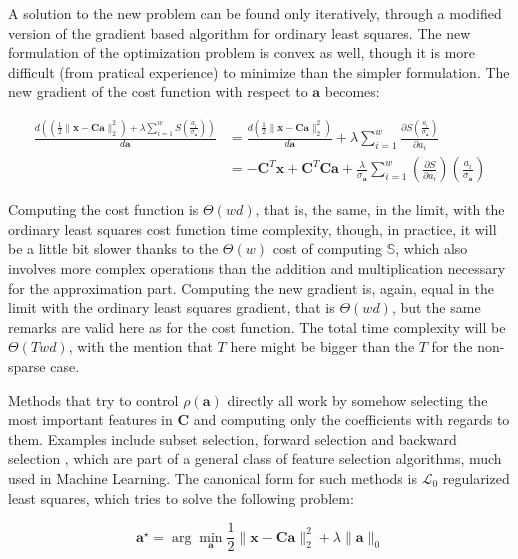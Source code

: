 \documentclass[12pt,a4paper,oneside,english]{UPBThesis}
\begin{document}
A solution to the new problem can be found only iteratively, through a modified version of the gradient based algorithm for ordinary least squares. The new formulation of the optimization problem is convex as well, though it is more difficult (from pratical experience) to minimize than the simpler formulation. The new gradient of the cost function with respect to $\textbf{a}$ becomes:

\begin{align*}
\frac{d \left( \left( \frac{1}{2}\|\textbf{x} - \textbf{C}\textbf{a}\|_2^2 \right) + \lambda\sum_{i=1}^{w}{S(\frac{a_i}{\sigma_{\textbf{a}}})} \right)}{d\textbf{a}} & = \frac{d \left( \frac{1}{2}\|\textbf{x} - \textbf{C}\textbf{a}\|_2^2 \right)}{d\textbf{a}} + \lambda\sum_{i=1}^{w}\frac{\partial S(\frac{a_i}{\sigma_{\textbf{a}}})}{\partial a_i} \\
& = -\textbf{C}^T\textbf{x} + \textbf{C}^T\textbf{C}\textbf{a} + \frac{\lambda}{\sigma_{\textbf{a}}} \sum_{i=1}^{w} {\left( \frac{\partial S}{\partial a_i} \right) \left( \frac{a_i}{\sigma_{\textbf{a}}} \right)}
\end{align*}

Computing the cost function is $\Theta(wd)$, that is, the same, in the limit, with the ordinary least squares cost function time complexity, though, in practice, it will be a little bit slower thanks to the $\Theta(w)$ cost of computing $\mathbb{S}$, which also involves more complex operations than the addition and multiplication necessary for the approximation part. Computing the new gradient is, again, equal in the limit with the ordinary least squares gradient, that is $\Theta(wd)$, but the same remarks are valid here as for the cost function. The total time complexity will be $\Theta(Twd)$, with the mention that $T$ here might be bigger than the $T$ for the non-sparse case.

Methods that try to control $\rho(\textbf{a})$ directly all work by somehow selecting the most important features in $\textbf{C}$ and computing only the coefficients with regards to them. Examples include subset selection, forward selection and backward selection \cite{elements-statistical-learning}, which are part of a general class of feature selection algorithms, much used in Machine Learning. The canonical form for such methods is $\mathcal{L}_0$ regularized least squares, which tries to solve the following problem:

\begin{equation*}
\textbf{a}^{\star} = \arg\min_{\textbf{a}} \frac{1}{2} \| \textbf{x} - \textbf{C}\textbf{a} \|_2^2 + \lambda \| \textbf{a} \|_0
\end{equation*}
\end{document}
